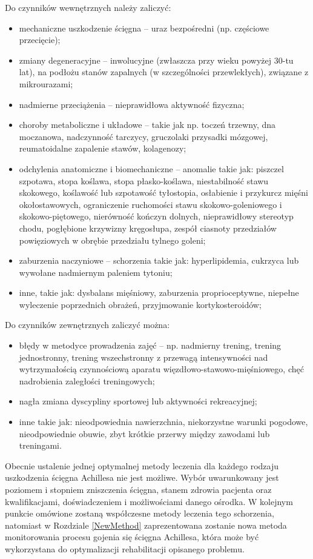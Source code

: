 Do czynników wewnętrznych należy zaliczyć:
\begin{itemize}
	\item mechaniczne uszkodzenie ścięgna -- uraz bezpośredni (np. częściowe przecięcie);
	\item zmiany degeneracyjne -- inwolucyjne (zwłaszcza przy wieku powyżej 30-tu lat), na podłożu stanów zapalnych (w szczególności przewlekłych), związane z mikrourazami;
	\item nadmierne przeciążenia -- nieprawidłowa aktywność fizyczna;
	\item choroby metaboliczne i układowe -- takie jak np. toczeń trzewny, dna moczanowa, nadczynność tarczycy, gruczolaki przysadki mózgowej, reumatoidalne zapalenie stawów, kolagenozy;
	\item odchylenia anatomiczne i biomechaniczne -- anomalie takie jak: piszczel szpotawa, stopa koślawa, stopa płasko-koślawa, niestabilność stawu skokowego, koślawość lub szpotawość tyłostopia, osłabienie i przykurcz mięśni okołostawowych, ograniczenie ruchomości stawu skokowo-goleniowego i skokowo-piętowego, nierówność kończyn dolnych, nieprawidłowy stereotyp chodu, pogłębione krzywizny kręgosłupa, zespół ciasnoty przedziałów powięziowych w obrębie przedziału tylnego goleni;
	\item zaburzenia naczyniowe -- schorzenia takie jak: hyperlipidemia, cukrzyca lub wywołane nadmiernym paleniem tytoniu;
	\item inne, takie jak: dysbalans mięśniowy, zaburzenia proprioceptywne, niepełne wyleczenie poprzednich obrażeń, przyjmowanie kortykosteroidów;
\end{itemize}

Do czynników zewnętrznych zaliczyć można:
\begin{itemize}
	\item błędy w metodyce prowadzenia zajęć -- np. nadmierny trening, trening jednostronny, trening wszechstronny z przewagą intensywności nad wytrzymałością czynnościową aparatu więzdłowo-stawowo-mięśniowego, chęć nadrobienia zaległości treningowych;
	\item nagła zmiana dyscypliny sportowej lub aktywności rekreacyjnej;
	\item inne takie jak: nieodpowiednia nawierzchnia, niekorzystne warunki pogodowe, nieodpowiednie obuwie, zbyt krótkie przerwy między zawodami lub treningami.
\end{itemize}

Obecnie ustalenie jednej optymalnej metody leczenia dla każdego rodzaju uszkodzenia ścięgna Achillesa nie jest możliwe. Wybór uwarunkowany jest poziomem i stopniem zniszczenia ścięgna, stanem zdrowia pacjenta oraz kwalifikacjami, doświadczeniem i możliwościami danego ośrodka. W kolejnym punkcie omówione zostaną współczesne metody leczenia tego schorzenia, natomiast w Rozdziale \ref{NewMethod} zaprezentowana zostanie nowa metoda monitorowania procesu gojenia się ścięgna Achillesa, która może być wykorzystana do optymalizacji rehabilitacji opisanego problemu. 

